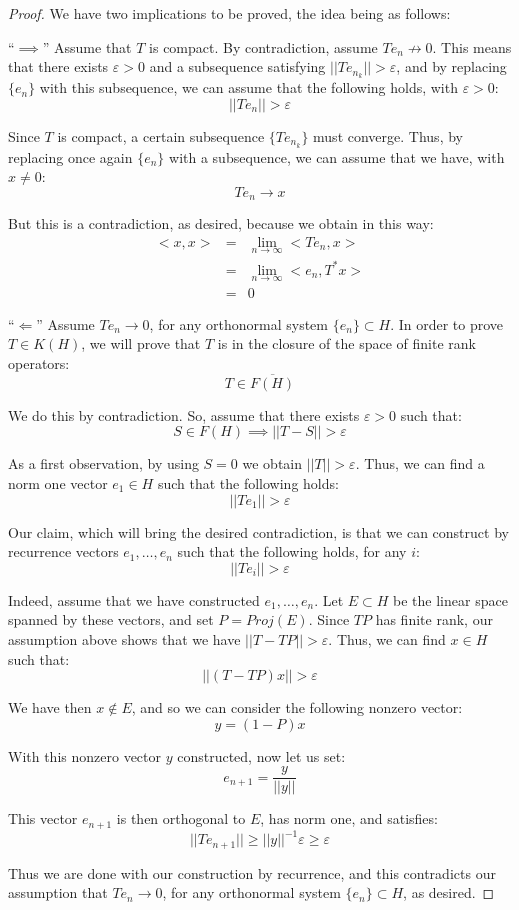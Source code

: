 \documentclass[12pt]{amsbook}
\begin{document}
\begin{proof}
We have two implications to be proved, the idea being as follows:

\medskip

``$\implies$'' Assume that $T$ is compact. By contradiction, assume $Te_n\not\to0$. This means that there exists $\varepsilon>0$ and a subsequence satisfying $||Te_{n_k}||>\varepsilon$, and by replacing $\{e_n\}$ with this subsequence, we can assume that the following holds, with $\varepsilon>0$:
$$||Te_n||>\varepsilon$$

Since $T$ is compact, a certain subsequence $\{Te_{n_k}\}$ must converge. Thus, by replacing once again $\{e_n\}$ with a subsequence, we can assume that we have, with $x\neq0$:
$$Te_n\to x$$

But this is a contradiction, as desired, because we obtain in this way:
\begin{eqnarray*}
<x,x>
&=&\lim_{n\to\infty}<Te_n,x>\\
&=&\lim_{n\to\infty}<e_n,T^*x>\\
&=&0
\end{eqnarray*}

``$\Longleftarrow$'' Assume $Te_n\to0$, for any orthonormal system $\{e_n\}\subset H$. In order to prove $T\in K(H)$, we will prove that $T$ is in the closure of the space of finite rank operators:
$$T\in\overline{F(H)}$$

We do this by contradiction. So, assume that there exists $\varepsilon>0$ such that:
$$S\in F(H)\implies||T-S||>\varepsilon$$

As a first observation, by using $S=0$ we obtain $||T||>\varepsilon$. Thus, we can find a norm one vector $e_1\in H$ such that the following holds:
$$||Te_1||>\varepsilon$$

Our claim, which will bring the desired contradiction, is that we can construct by recurrence vectors $e_1,\ldots,e_n$ such that the following holds, for any $i$: 
$$||Te_i||>\varepsilon$$

Indeed, assume that we have constructed $e_1,\ldots,e_n$. Let $E\subset H$ be the linear space spanned by these vectors, and set $P=Proj(E)$. Since $TP$ has finite rank, our assumption above shows that we have $||T-TP||>\varepsilon$. Thus, we can find $x\in H$ such that:
$$||(T-TP)x||>\varepsilon$$

We have then $x\not\in E$, and so we can consider the following nonzero vector:
$$y=(1-P)x$$

With this nonzero vector $y$ constructed, now let us set:
$$e_{n+1}=\frac{y}{||y||}$$

This vector $e_{n+1}$ is then orthogonal to $E$, has norm one, and satisfies:
$$||Te_{n+1}||\geq||y||^{-1}\varepsilon\geq\varepsilon$$

Thus we are done with our construction by recurrence, and this contradicts our assumption that $Te_n\to0$, for any orthonormal system $\{e_n\}\subset H$, as desired.
\end{proof}
\end{document}
